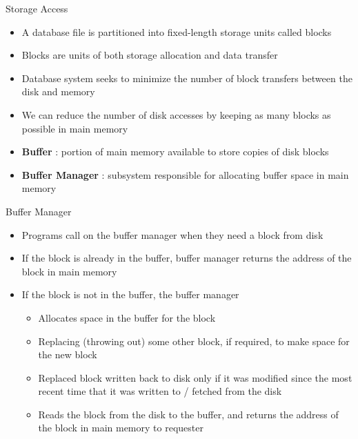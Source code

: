 \documentclass[aspectratio=169, xcolor=dvipsnames]{beamer}
\begin{document}
\begin{frame}{Storage Access}
    \begin{block}{}
        \begin{itemize}
            \item A database file is partitioned into fixed-length storage units called blocks
            \item Blocks are units of both storage allocation and data transfer
            \item Database system seeks to minimize the number of block transfers between the disk and memory
            \item We can reduce the number of disk accesses by keeping as many blocks as possible in main memory
            \item \textbf{Buffer} : portion of main memory available to store copies of disk blocks
            \item \textbf{Buffer Manager} : subsystem responsible for allocating buffer space in main memory
        \end{itemize}
    \end{block}
\end{frame}

\begin{frame}{Buffer Manager}
    \begin{block}{}
        \begin{itemize}
            \item Programs call on the buffer manager when they need a block from disk
            \item If the block is already in the buffer, buffer manager returns the address of the block in main memory
            \item If the block is not in the buffer, the buffer manager
            \begin{itemize}
                \item Allocates space in the buffer for the block
                \item Replacing (throwing out) some other block, if required, to make space for the new block
                \item Replaced block written back to disk only if it was modified since the most recent time that it was written to / fetched from the disk
                \item Reads the block from the disk to the buffer, and returns the address of the block in main memory to requester
            \end{itemize}
        \end{itemize}
    \end{block}
\end{frame}
\end{document}
